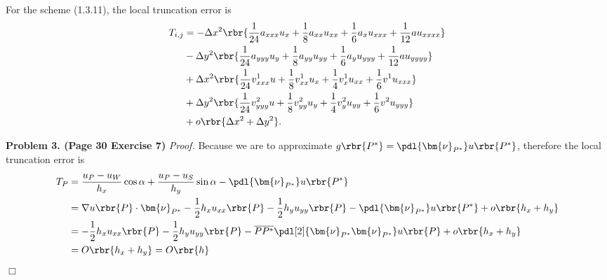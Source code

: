 \documentclass[english, nochinese]{pnote}
\begin{document}
For the scheme (1.3.11), the local truncation error is
\begin{equation}
\begin{split}
T_{ i, j } &= - \Delta x^2 \rbr{ \frac{1}{24} a_{ x x x } u_x + \frac{1}{8} a_{ x x } u_{ x x } + \frac{1}{6} a_x u_{ x x x } + \frac{1}{12} a u_{ x x x x } } \\
&- \Delta y^2 \rbr{ \frac{1}{24} a_{ y y y } u_y + \frac{1}{8} a_{ y y } u_{ y y } + \frac{1}{6} a_y u_{ y y y } + \frac{1}{12} a u_{ y y y y } } \\
&+ \Delta x^2 \rbr{ \frac{1}{24} v^1_{ x x x } u + \frac{1}{8} v^1_{ x x } u_x + \frac{1}{4} v^1_x u_{ x x } + \frac{1}{6} v^1 u_{ x x x } } \\
&+ \Delta y^2 \rbr{ \frac{1}{24} v^2_{ y y y } u + \frac{1}{8} v^2_{ y y } u_y + \frac{1}{4} v^2_y u_{ y y } + \frac{1}{6} v^2 u_{ y y y } } \\
&+ o \rbr{ \Delta x^2 + \Delta y^2 }.
\end{split}
\end{equation}

\textbf{Problem 3. (Page 30 Exercise 7)} \textit{Proof.} Because we are to approximate $ g \rbr{P^{\ast}} = \pdl{\bm{\nu}_{P^{\ast}}} u \rbr{P^{\ast}} $, therefore the local truncation error is
\begin{equation}
\begin{split}
T_P &= \frac{ u_P - u_W }{h_x} \cos \alpha + \frac{ u_P - u_S }{h_y} \sin \alpha - \pdl{\bm{\nu}_{P^{\ast}}} u \rbr{P^{\ast}} \\
&= \nabla u \rbr{P} \cdot \bm{\nu}_{P^{\ast}} - \frac{1}{2} h_x u_{ x x } \rbr{P} - \frac{1}{2} h_y u_{ y y } \rbr{P} - \pdl{\bm{\nu}_{P^{\ast}}} u \rbr{P^{\ast}} + o \rbr{ h_x + h_y } \\
&= -\frac{1}{2} h_x u_{ x x } \rbr{P} - \frac{1}{2} h_y u_{ y y } \rbr{P} - \overline{ P P^{\ast} } \pdl[2]{ \bm{\nu}_{P^{\ast}} \bm{\nu}_{P^{\ast}} } u \rbr{P} + o \rbr{ h_x + h_y } \\
&= O \rbr{ h_x + h_y } = O \rbr{h}
\end{split}
\end{equation}
\hfill$\Box$
\end{document}

